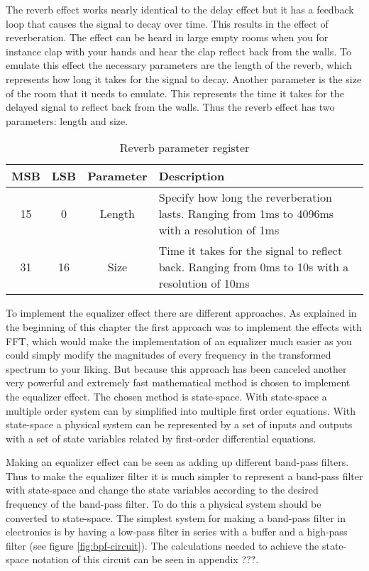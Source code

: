 The reverb effect works nearly identical to the delay effect but it has a feedback loop that causes the signal to decay over time. This results in the effect of reverberation. The effect can be heard in large empty rooms when you for instance clap with your hands and hear the clap reflect back from the walls. To emulate this effect the necessary parameters are the length of the reverb, which represents how long it takes for the signal to decay. Another parameter is the size of the room that it needs to emulate. This represents the time it takes for the delayed signal to reflect back from the walls. Thus the reverb effect has two parameters: length and size.

\begin{table}[h!]
    \centering
    \begin{tabular}{|c|c|c|p{3.5in}|}
        \hline
        MSB & LSB & Parameter & Description\\
        \hline
        15 & 0 & Length & Specify how long the reverberation lasts. Ranging from 1ms to 4096ms with a resolution of 1ms\\
        \hline
        31 & 16 & Size & Time it takes for the signal to reflect back. Ranging from 0ms to 10s with a resolution of 10ms\\
        \hline
    \end{tabular}
    \caption{Reverb parameter register}
    \label{table:reverb-effect-parameters}
\end{table}

To implement the equalizer effect there are different approaches. As explained in the beginning of this chapter the first approach was to implement the effects with FFT, which would make the implementation of an equalizer much easier as you could simply modify the magnitudes of every frequency in the transformed spectrum to your liking. But because this approach has been canceled another very powerful and extremely fast mathematical method is chosen to implement the equalizer effect. The chosen method is state-space. With state-space a multiple order system can by simplified into multiple first order equations. With state-space a physical system can be represented by a set of inputs and outputs with a set of state variables related by first-order differential equations. 

Making an equalizer effect can be seen as adding up different band-pass filters. Thus to make the equalizer filter it is much simpler to represent a band-pass filter with state-space and change the state variables according to the desired frequency of the band-pass filter. To do this a physical system should be converted to state-space. The simplest system for making a band-pass filter in electronics is by having a low-pass filter in series with a buffer and a high-pass filter (see figure \ref{fig:bpf-circuit}). The calculations needed to achieve the state-space notation of this circuit can be seen in appendix ???.

